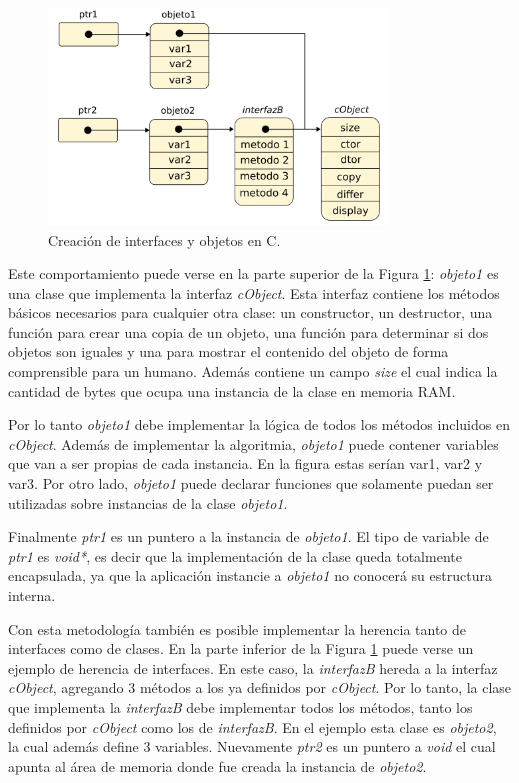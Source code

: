 \begin{figure}[h]
	\centering
	\includegraphics[width=9cm]{./Figures/3_2_3_c_orientado_objetos.png}
	\caption{Creación de interfaces y objetos en C.}
	\label{fig:firmware_diagrama_interfaces}
\end{figure}

Este comportamiento puede verse en la parte superior de la Figura \ref{fig:firmware_diagrama_interfaces}: \textit{objeto1} es una clase que implementa la  interfaz \textit{cObject}. Esta interfaz contiene los métodos básicos necesarios para cualquier otra clase: un constructor, un destructor, una función para crear una copia de un objeto, una función para determinar si dos objetos son iguales y una para mostrar el contenido del objeto de forma comprensible para un humano. Además contiene un campo \textit{size} el cual indica la cantidad de bytes que ocupa una instancia de la clase en memoria RAM.

Por lo tanto \textit{objeto1} debe implementar la lógica de todos los métodos incluidos en \textit{cObject}. Además de implementar la algoritmia, \textit{objeto1} puede contener variables que van a ser propias de cada instancia. En la figura estas serían var1, var2 y var3. Por otro lado, \textit{objeto1} puede declarar funciones que solamente puedan ser utilizadas sobre instancias de la clase \textit{objeto1}.

Finalmente \textit{ptr1} es un puntero a la instancia de \textit{objeto1}. El tipo de variable de \textit{ptr1} es \textit{void*}, es decir que la implementación de la clase queda totalmente encapsulada, ya que la aplicación instancie a \textit{objeto1} no conocerá su estructura interna.

Con esta metodología también es posible implementar la herencia tanto de interfaces como de clases. En la parte inferior de la Figura \ref{fig:firmware_diagrama_interfaces} puede verse un ejemplo de herencia de interfaces. En este caso, la \textit{interfazB} hereda a la interfaz \textit{cObject}, agregando 3 métodos a los ya definidos por \textit{cObject}. Por lo tanto, la clase que implementa la \textit{interfazB} debe implementar todos los métodos, tanto los definidos por \textit{cObject} como los de \textit{interfazB}. En el ejemplo esta clase es \textit{objeto2}, la cual además define 3 variables. Nuevamente \textit{ptr2} es un puntero a \textit{void} el cual apunta al área de memoria donde fue creada la instancia de \textit{objeto2}.

